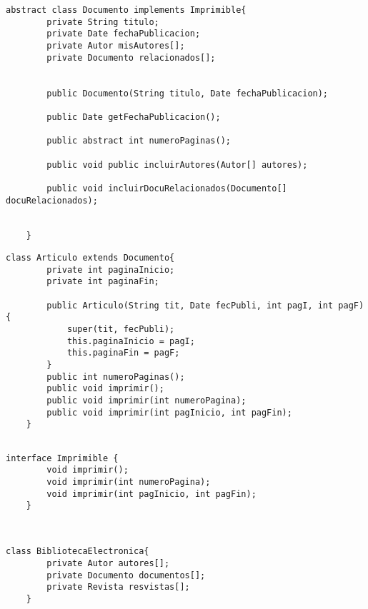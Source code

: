 \documentclass[a4paper,12pt]{article}
\begin{document}
\begin{lstlisting}[style=customjava, caption={lase Documento (cabecera, atributos y cabeceras de los métodos)}]
    abstract class Documento implements Imprimible{
        private String titulo;
        private Date fechaPublicacion;
        private Autor misAutores[];
        private Documento relacionados[];


        public Documento(String titulo, Date fechaPublicacion);

        public Date getFechaPublicacion();

        public abstract int numeroPaginas();

        public void public incluirAutores(Autor[] autores);

        public void incluirDocuRelacionados(Documento[] docuRelacionados);


    }

\end{lstlisting}

\begin{lstlisting}[style=customjava, caption={clase Articulo (cabecera, atributos y cabeceras de los métodos), constructor de la clase Artículo}]
    class Articulo extends Documento{
        private int paginaInicio;
        private int paginaFin;

        public Articulo(String tit, Date fecPubli, int pagI, int pagF){
            super(tit, fecPubli);
            this.paginaInicio = pagI;
            this.paginaFin = pagF;
        }
        public int numeroPaginas();
        public void imprimir();
        public void imprimir(int numeroPagina);
        public void imprimir(int pagInicio, int pagFin);
    }
    
\end{lstlisting}

\begin{lstlisting}[style=customjava, caption = {Intefaz Imprimible}]
    interface Imprimible {
        void imprimir();
        void imprimir(int numeroPagina);
        void imprimir(int pagInicio, int pagFin);
    }



\end{lstlisting}

\begin{lstlisting}[style = customjava, caption = {Atributos que definen el estado de la clase BibliotecaElectronica}]
    class BibliotecaElectronica{
        private Autor autores[];
        private Documento documentos[];
        private Revista resvistas[];
    }
\end{lstlisting}
\end{document}
